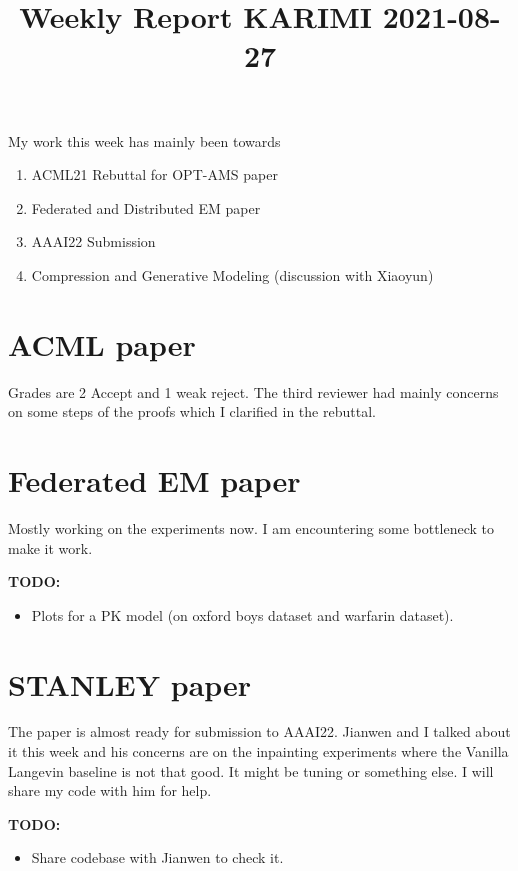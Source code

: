 \documentclass{article}
\begin{document}
\title{Weekly Report KARIMI 2021-08-27}


\date{}
\maketitle

\vspace{-0.5in}

My work this week has mainly been towards
\begin{enumerate}
\item ACML21 Rebuttal for OPT-AMS paper
\item Federated and Distributed EM paper
\item AAAI22 Submission
\item Compression and Generative Modeling (discussion with Xiaoyun)
\end{enumerate}



\section{ACML paper}

Grades are 2 Accept and 1 weak reject.
The third reviewer had mainly concerns on some steps of the proofs which I clarified in the rebuttal.


\section{Federated EM paper}

Mostly working on the experiments now.
I am encountering some bottleneck to make it work.


\textbf{TODO:}
\begin{itemize}
\item Plots for a PK model (on oxford boys dataset and warfarin dataset).
\end{itemize}


\section{STANLEY paper}

The paper is almost ready for submission to AAAI22.
Jianwen and I talked about it this week and his concerns are on the inpainting experiments where the Vanilla Langevin baseline is not that good.
It might be tuning or something else.
I will share my code with him for help.

\textbf{TODO:}
\begin{itemize}
\item Share codebase with Jianwen to check it.
\end{itemize}
\end{document}
